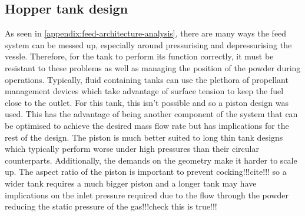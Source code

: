 \subsection{Hopper tank design}
As seen in \autoref{appendix:feed-architecture-analysis}, there are many ways the feed system can be messed up, especially around pressurising and depressurising the vessle. Therefore, for the tank to perform its function correctly, it must be resistant to these problems as well as managing the position of the powder during operations. Typically, fluid containing tanks can use the plethora of propellant management devices which take advantage of surface tension to keep the fuel close to the outlet. For this tank, this isn't possible and so a piston design was used. This has the advantage of being another component of the system that can be optimised to achieve the desired mass flow rate but has implications for the rest of the design. The piston is much better suited to long thin tank designs which typically perform worse under high pressures than their circular counterparts. Additionally, the demands on the geometry make it harder to scale up. The aspect ratio of the piston is important to prevent cocking!!!cite!!! so a wider tank requires a much bigger piston and a longer tank may have implications on the inlet pressure required due to the flow through the powder reducing the static pressure of the gas!!!check this is true!!!

